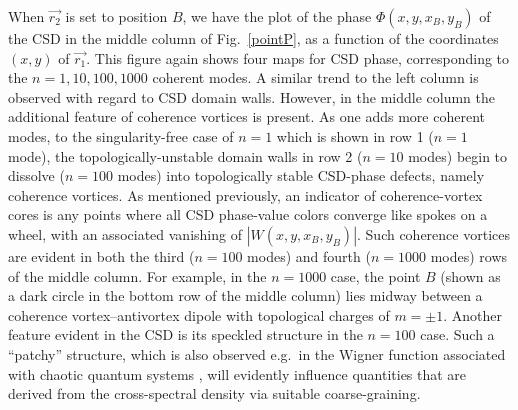 \documentclass[%
 reprint,
 amsmath,amssymb,
 aps,
]{revtex4-1}
\begin{document}
When $\vec{r_2}$ is set to position $B$, we have the plot of the phase $\Phi(x,y,x_B,y_B)$ of the CSD in the middle column of Fig.~\ref{pointP}, as a function of the coordinates $(x,y)$ of $\vec{r_1}$.  This figure again shows four maps for CSD phase, corresponding to the $n=1,10,100,1000$ coherent modes.  A similar trend to the left column is observed with regard to CSD domain walls.  However, in the middle column the additional feature of coherence vortices is present.  As one adds more coherent modes, to the singularity-free case of $n=1$ which is shown in row 1 ($n=1$ mode), the topologically-unstable domain walls in row 2 ($n=10$ modes) begin to dissolve ($n=100$ modes) into  topologically stable CSD-phase defects, namely coherence vortices. As mentioned previously, an indicator of coherence-vortex cores is any points where all CSD phase-value colors converge like spokes on a wheel, with an associated vanishing of $|W(x,y,x_B,y_B)|$.  Such coherence vortices are evident in both the third ($n=100$ modes) and fourth ($n=1000$ modes) rows of the middle column.  For example, in the $n=1000$ case, the point $B$ (shown as a dark circle in the bottom row of the middle column) lies midway between a coherence vortex--antivortex dipole with topological charges of $m = \pm 1$. Another feature evident in the CSD is its speckled  structure in the $n=100$ case.  Such a ``patchy'' structure, which is also observed e.g.~in the Wigner function associated with chaotic quantum systems \cite{Zurek}, will evidently influence quantities that are derived from the cross-spectral density via suitable coarse-graining.
\end{document}
